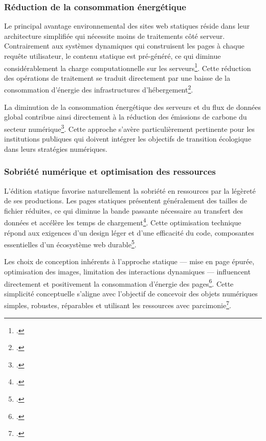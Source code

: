 \subsubsection{Réduction de la consommation énergétique}

Le principal avantage environnemental des sites web statiques réside dans leur architecture simplifiée qui nécessite moins de traitements côté serveur. Contrairement aux systèmes dynamiques qui construisent les pages à chaque requête utilisateur, le contenu statique est pré-généré, ce qui diminue considérablement la charge computationnelle sur les serveurs\footcite{benzingLuwakContentManagement2006}. Cette réduction des opérations de traitement se traduit directement par une baisse de la consommation d'énergie des infrastructures d'hébergement\footcite{bihouixTransitionEnergetiquePeutelle2019}.

La diminution de la consommation énergétique des serveurs et du flux de données global contribue ainsi directement à la réduction des émissions de carbone du secteur numérique\footcite{novaLowtechNumeriqueAux2020}. Cette approche s'avère particulièrement pertinente pour les institutions publiques qui doivent intégrer les objectifs de transition écologique dans leurs stratégies numériques.

\subsubsection{Sobriété numérique et optimisation des ressources}

L'édition statique favorise naturellement la sobriété en ressources par la légèreté de ses productions. Les pages statiques présentent généralement des tailles de fichier réduites, ce qui diminue la bande passante nécessaire au transfert des données et accélère les temps de chargement\footcite{novaLowtechNumeriqueAux2020}. Cette optimisation technique répond aux exigences d'un design léger et d'une efficacité du code, composantes essentielles d'un écosystème web durable\footcite{otooleSustainableWebEcosystem2013}.

Les choix de conception inhérents à l'approche statique --- mise en page épurée, optimisation des images, limitation des interactions dynamiques --- influencent directement et positivement la consommation d'énergie des pages\footcite{otooleSustainableWebEcosystem2013}. Cette simplicité conceptuelle s'aligne avec l'objectif de concevoir des objets numériques simples, robustes, réparables et utilisant les ressources avec parcimonie\footcite{bihouixHighTechOuLowTech2022}.

